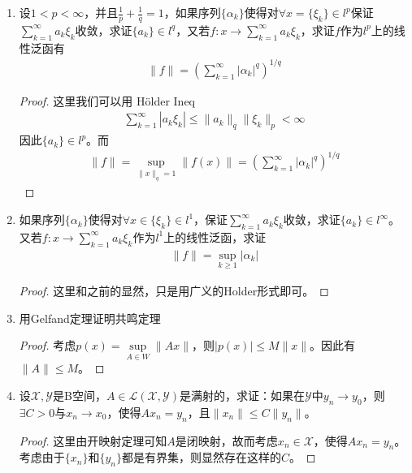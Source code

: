 \begin{enumerate}[leftmargin=2cm, label=\arabic*]
		\item 设$1<p<\infty$，并且$\frac{1}{p}+\frac{1}{q}=1$，如果序列$\{\alpha_k\}$使得对$\forall x = \{\xi_k\}\in l^p$保证$\sum\limits_{k=1}^{\infty} a_k\xi_k$收敛，求证$\{a_k\}\in l^q$，又若$f:x\to\sum\limits_{k=1}^{\infty} a_k\xi_k$，求证$f$作为$l^p$上的线性泛函有
		\begin{align*}
			\|f\| = \left(\sum\limits_{k=1}^{\infty} |\alpha_k|^q \right)^{1/q}
		\end{align*}
		\begin{proof}
			这里我们可以用 Hölder Ineq 
			\begin{align*}
				\sum\limits_{k=1}^{\infty} |a_k \xi_k| \leqslant \|a_k\|_q \|\xi_k\|_p < \infty
			\end{align*}
			因此$\{a_k\}\in l^p$。而
			\begin{align*}
				\|f\| = \sup\limits_{\|x\|_q = 1} \|f(x)\| = \left(\sum\limits_{k=1}^{\infty} |\alpha_k|^q \right)^{1/q}
			\end{align*}
		\end{proof}
		
		\item 如果序列$\{\alpha_k\}$使得对$\forall x\in\{\xi_k\} \in l^1$，保证$\sum\limits_{k=1}^{\infty} a_k\xi_k$收敛，求证$\{a_k\}\in l^{\infty}$。又若$f:x\to\sum\limits_{k=1}^{\infty} a_k\xi_k$作为$l^1$上的线性泛函，求证
		\begin{align*}
			\|f\| = \sup\limits_{k\geqslant 1} |\alpha_k|
		\end{align*}
		\begin{proof}
			这里和之前的显然，只是用广义的Holder形式即可。
		\end{proof}
		
		\item 用Gelfand定理证明共鸣定理
		\begin{proof}
			考虑$p(x) = \sup\limits_{A\in W} \|Ax\|$，则$|p(x)|\leqslant M\|x\|$。因此有$\|A\|\leqslant M$。
		\end{proof}
		
		\item 设$\mathscr{X},\mathscr{Y}$是B空间，$A\in\mathscr{L}(\mathscr{X},\mathscr{Y})$是满射的，求证：如果在$\mathscr{Y}$中$y_n\to y_0$，则$\exists C>0$与$x_n\to x_0$，使得$Ax_n = y_n$，且$\|x_n\| \leqslant C\|y_n\|$。
		\begin{proof}
			这里由开映射定理可知$A$是闭映射，故而考虑$x_n\in\mathscr{X}$，使得$Ax_n = y_n$。考虑由于$\{x_n\}$和$\{y_n\}$都是有界集，则显然存在这样的$C$。
		\end{proof}
		

\end{enumerate}
